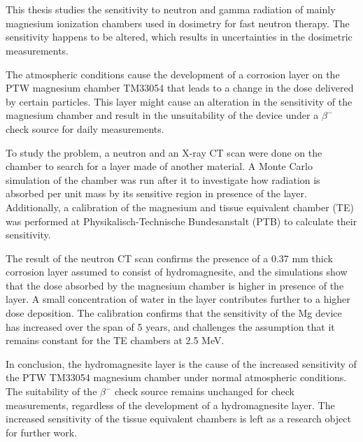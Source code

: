 \chapter{\abstractname}

This thesis studies the sensitivity to neutron and gamma radiation of mainly magnesium ionization chambers used in dosimetry for fast neutron therapy. The sensitivity happens to be altered, which results in uncertainties in the dosimetric measurements.

The atmospheric conditions cause the development of a corrosion layer on the PTW magnesium chamber TM33054 that leads to a change in the dose delivered by certain particles. This layer might cause an alteration in the sensitivity of the magnesium chamber and result in the unsuitability of the device under a $\beta^-$ check source for daily measurements.

To study the problem, a neutron and an X-ray CT scan were done on the chamber to search for a layer made of another material. A Monte Carlo simulation of the chamber was run after it to investigate how radiation is absorbed per unit mass by its sensitive region in presence of the layer. Additionally, a calibration of the magnesium and tissue equivalent chamber (TE) was performed at Physikalisch-Technische Bundesanstalt (PTB) to calculate their sensitivity.

The result of the neutron CT scan confirms the presence of a 0.37 \unit{\milli\meter} thick corrosion layer assumed to consist of hydromagnesite, and the simulations show that the dose absorbed by the magnesium chamber is higher in presence of the layer. A small concentration of water in the layer contributes further to a higher dose deposition. The calibration confirms that the sensitivity of the Mg device has increased over the span of 5 years, and challenges the assumption that it remains constant for the TE chambers at 2.5 \unit{\mega\electronvolt}. 

In conclusion, the hydromagnesite layer is the cause of the increased sensitivity of the PTW TM33054 magnesium chamber under normal atmospheric conditions. The suitability of the $\beta^-$ check source remains unchanged for check measurements, regardless of the development of a hydromagnesite layer. The increased sensitivity of the tissue equivalent chambers is left as a research object for further work.

\cleardoublepage{}
